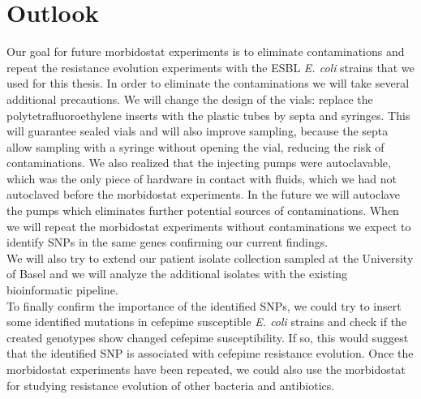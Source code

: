 \section{Outlook}
Our goal for future morbidostat experiments is to eliminate contaminations and repeat the resistance evolution experiments with the ESBL \textit{E. coli} strains that we used for this thesis. In order to eliminate the contaminations we will take several additional precautions. We will change the design of the vials: replace the polytetrafluoroethylene inserts with the plastic tubes by septa and syringes. This will guarantee sealed vials and will also improve sampling, because the septa allow sampling with a syringe without opening the vial, reducing the risk of contaminations. We also realized that the injecting pumps were autoclavable, which was the only piece of hardware in contact with fluids, which we had not autoclaved before the morbidostat experiments. In the future we will autoclave the pumps which eliminates further potential sources of contaminations. When we will repeat the morbidostat experiments without contaminations we expect to identify SNPs in the same genes confirming our current findings. \\
We will also try to extend our patient isolate collection sampled at the University of Basel and we will analyze the additional isolates with the existing bioinformatic pipeline.  \\
To finally confirm the importance of the identified SNPs, we could try to insert some identified mutations in cefepime susceptible \textit{E. coli} strains and check if the created genotypes show changed cefepime susceptibility. If so, this would suggest that the identified SNP is associated with cefepime resistance evolution. Once the morbidostat experiments have been repeated, we could also use the morbidostat for studying resistance evolution of other bacteria and antibiotics.
